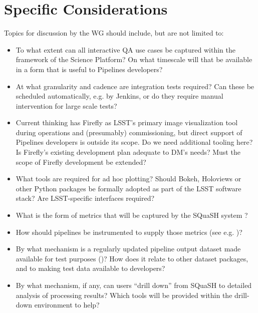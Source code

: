 \documentclass[DM,lsstdraft,toc]{lsstdoc}
\begin{document}
\section{Specific Considerations}

Topics for discussion by the WG should include, but are not limited to:

\begin{itemize}

  \item{To what extent can all interactive QA use cases be captured within the
  framework of the Science Platform? On what timescale will that be available
  in a form that is useful to Pipelines developers?}

  \item{At what granularity and cadence are integration tests required? Can
  these be scheduled automatically, e.g. by Jenkins, or do they require manual
  intervention for large scale tests?}

  \item{Current thinking has Firefly as LSST's primary image visualization
  tool during operations and (presumably) commissioning, but direct support of
  Pipelines developers is outside its scope. Do we need additional tooling
  here? Is Firefly's existing development plan adequate to DM's needs? Must
  the scope of Firefly development be extended?}

  \item{What tools are required for ad hoc plotting? Should Bokeh, Holoviews
  or other Python packages be formally adopted as part of the LSST software
  stack? Are LSST-specific interfaces required?}

  \item{What is the form of metrics that will be captured by the SQuaSH system
  ?}

  \item{How should pipelines be instrumented to supply those metrics (see e.g.
  )?}

  \item{By what mechanism is a regularly updated pipeline output dataset made
  available for test purposes ()? How does it relate to other
  dataset packages, and to making test data available to developers?}

  \item{By what mechanism, if any, can users ``drill down'' from SQuaSH to
  detailed analysis of processing results? Which tools will be provided within
  the drill-down environment to help?}

\end{itemize}
\end{document}
